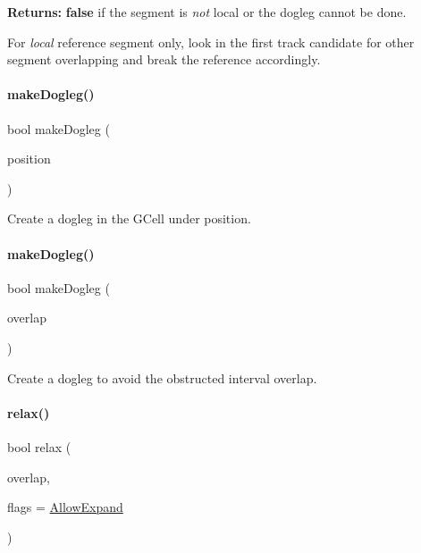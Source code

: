 {\bfseries Returns\+:} {\bfseries false} if the segment is {\itshape not} local or the dogleg cannot be done.

For {\itshape local} reference segment only, look in the first track candidate for other segment overlapping and break the reference accordingly. \mbox{\label{classKite_1_1Manipulator_a97e56b831481ef65309f6e3b7e3f4f3d}} 
\paragraph{\texorpdfstring{make\+Dogleg()}{makeDogleg()}\hspace{0.1cm}{\footnotesize\ttfamily [2/3]}}
{\footnotesize\ttfamily bool make\+Dogleg (\begin{DoxyParamCaption}\item[{\textbf{ Db\+U\+::\+Unit}}]{position }\end{DoxyParamCaption})}

Create a dogleg in the G\+Cell under {\ttfamily position}. \mbox{\label{classKite_1_1Manipulator_af7b3305693dab195d0c5d075821fbb30}} 
\paragraph{\texorpdfstring{make\+Dogleg()}{makeDogleg()}\hspace{0.1cm}{\footnotesize\ttfamily [3/3]}}
{\footnotesize\ttfamily bool make\+Dogleg (\begin{DoxyParamCaption}\item[{\textbf{ Interval}}]{overlap }\end{DoxyParamCaption})}

Create a dogleg to avoid the obstructed interval {\ttfamily overlap}. \mbox{\label{classKite_1_1Manipulator_a8b5b69fd5762d5a0cbc4ceea4d1b68c1}} 
\paragraph{\texorpdfstring{relax()}{relax()}}
{\footnotesize\ttfamily bool relax (\begin{DoxyParamCaption}\item[{\textbf{ Interval}}]{overlap,  }\item[{unsigned int}]{flags = {\ttfamily \mbox{\hyperlink{classKite_1_1Manipulator_a2af2ad6b6441614038caf59d04b3b217a41880b9f6652400677e21c8681f97675}{Allow\+Expand}}} }\end{DoxyParamCaption})}

